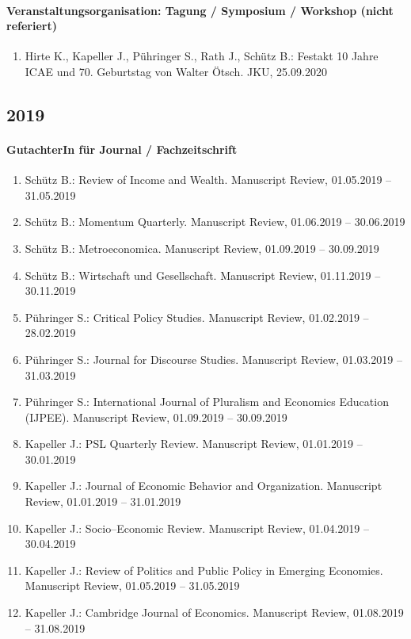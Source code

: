 \paragraph{Veranstaltungsorganisation: Tagung / Symposium / Workshop (nicht referiert)}
\begin{enumerate}[leftmargin=*, labelsep=0.5cm]
\item Hirte K., Kapeller J., Pühringer S., Rath J., Schütz B.: Festakt 10 Jahre ICAE und 70. Geburtstag von Walter Ötsch. JKU, 25.09.2020
\end{enumerate}\subsection*{2019}\paragraph{GutachterIn für Journal / Fachzeitschrift}
\begin{enumerate}[leftmargin=*, labelsep=0.5cm]
\item Schütz B.: Review of Income and Wealth. Manuscript Review, 01.05.2019 -- 31.05.2019
\item Schütz B.: Momentum Quarterly. Manuscript Review, 01.06.2019 -- 30.06.2019
\item Schütz B.: Metroeconomica. Manuscript Review, 01.09.2019 -- 30.09.2019
\item Schütz B.: Wirtschaft und Gesellschaft. Manuscript Review, 01.11.2019 -- 30.11.2019
\item Pühringer S.: Critical Policy Studies. Manuscript Review, 01.02.2019 -- 28.02.2019
\item Pühringer S.: Journal for Discourse Studies. Manuscript Review, 01.03.2019 -- 31.03.2019
\item Pühringer S.: International Journal of Pluralism and Economics Education (IJPEE). Manuscript Review, 01.09.2019 -- 30.09.2019
\item Kapeller J.: PSL Quarterly Review. Manuscript Review, 01.01.2019 -- 30.01.2019
\item Kapeller J.: Journal of Economic Behavior and Organization. Manuscript Review, 01.01.2019 -- 31.01.2019
\item Kapeller J.: Socio--Economic Review. Manuscript Review, 01.04.2019 -- 30.04.2019
\item Kapeller J.: Review of Politics and Public Policy in Emerging Economies. Manuscript Review, 01.05.2019 -- 31.05.2019
\item Kapeller J.: Cambridge Journal of Economics. Manuscript Review, 01.08.2019 -- 31.08.2019
\end{enumerate}
